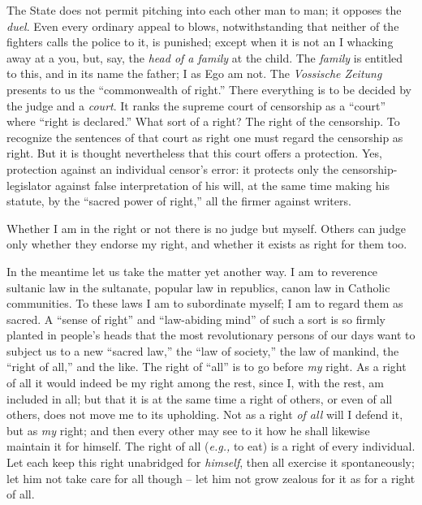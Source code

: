 \documentclass[12pt,a4paper]{book}
\begin{document}
The State does not permit pitching into each other man to man; it opposes the 
\textit{duel}. Even every ordinary appeal to blows, notwithstanding that 
neither of the fighters calls the police to it, is punished; except when it is 
not an I whacking away at a you, but, say, the \textit{head of a family} at 
the child. The \textit{family} is entitled to this, and in its name the 
father; I as Ego am not. The \textit{Vossische Zeitung} presents to us the 
``commonwealth of right.'' There everything is to be decided by the judge 
and a \textit{court}. It ranks the supreme court of censorship as a 
``court'' where ``right is declared.'' What sort of a right? The right of 
the censorship. To recognize the sentences of that court as right one must 
regard the censorship as right. But it is thought nevertheless that this court 
offers a protection. Yes, protection against an individual censor's error: it 
protects only the censorship-legislator against false interpretation of his 
will, at the same time making his statute, by the ``sacred power of right,'' 
all the firmer against writers.

Whether I am in the right or not there is no judge but myself. Others can 
judge only whether they endorse my right, and whether it exists as right for 
them too.

In the meantime let us take the matter yet another way. I am to reverence 
sultanic law in the sultanate, popular law in republics, canon law in Catholic 
communities. To these laws I am to subordinate myself; I am to regard them as 
sacred. A ``sense of right'' and ``law-abiding mind'' of such a sort is so 
firmly planted in people's heads that the most revolutionary persons of our 
days want to subject us to a new ``sacred law,'' the ``law of society,'' 
the law of mankind, the ``right of all,'' and the like. The right of 
``all'' is to go before \textit{my} right. As a right of all it would indeed 
be my right among the rest, since I, with the rest, am included in all; but 
that it is at the same time a right of others, or even of all others, does not 
move me to its upholding. Not as a right \textit{of all} will I defend it, but 
as \textit{my} right; and then every other may see to it how he shall likewise 
maintain it for himself. The right of all (\textit{e.g.,} to eat) is a right 
of every individual. Let each keep this right unabridged for \textit{himself}, 
then all exercise it spontaneously; let him not take care for all though -- 
let him not grow zealous for it as for a right of all.
\end{document}
